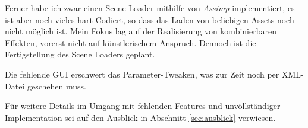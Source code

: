   	Ferner habe ich zwar einen Scene-Loader mithilfe von \emph{Assimp} implementiert, es ist aber noch vieles
  	hart-Codiert, so dass das Laden von beliebigen Assets noch nicht möglich ist. Mein Fokus lag
  	auf der Realisierung von kombinierbaren Effekten, vorerst nicht auf künstlerischem Anspruch. 
  	Dennoch ist die Fertigstellung des Scene Loaders geplant.
	
	Die fehlende GUI erschwert das Parameter-Tweaken, was zur Zeit noch per XML-Datei geschehen muss.
	
	Für weitere Details im Umgang mit fehlenden Features und unvöllständiger Implementation sei auf
	den Ausblick in Abschnitt \ref{sec:ausblick} verwiesen.

\clearpage
